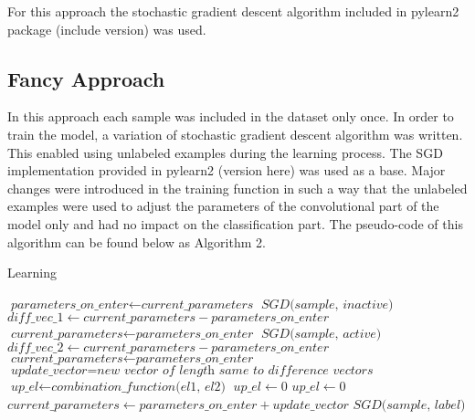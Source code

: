 \documentclass[a4paper,10pt]{report}
\begin{document}
      For this approach the stochastic gradient descent algorithm included in pylearn2 package (include version) was used.\\
	  
      \subsection{Fancy Approach}
      In this approach each sample was included in the dataset only once. In order to train the model, a variation of stochastic gradient descent algorithm was written. This enabled using unlabeled examples during the learning process. The SGD implementation provided in pylearn2 (version here) was used as a base. Major changes were introduced in the training function in such a way that the unlabeled examples were used to adjust the parameters of the convolutional part of the model only and had no impact on the classification part. The pseudo-code of this algorithm can be found below as Algorithm 2.\\
      
      \begin{algorithm}
      \caption{Learning}\label{euclid}
      \begin{algorithmic}[1]
	\State $\textit{parameters\_on\_enter} \gets \textit{current\_parameters}$
	\State
	\State $\textit{SGD(sample, inactive)}$
	\State $\textit{diff\_vec\_1} \gets \textit{current\_parameters} -\textit{parameters\_on\_enter}$
	\State $\textit{current\_parameters} \gets \textit{parameters\_on\_enter}$
	\State
	\State $\textit{SGD(sample, active)}$
	\State $\textit{diff\_vec\_2} \gets \textit{current\_parameters} - \textit{parameters\_on\_enter}$
	\State $\textit{current\_parameters} \gets \textit{parameters\_on\_enter}$
	\State
	\State $\textit{update\_vector} = \textit{new vector of length same to difference vectors}$
	    \State $\textit{up\_el} \gets \textit{combination\_function(el1, el2)}$
	  \Else
	    \State $\textit{up\_el} \gets 0$
	  \EndIf
	\EndFor
	\State
	    \State $\textit{up\_el} \gets 0$
	  \EndIf
	\EndFor
	\State
	\State $\textit{current\_parameters} \gets \textit{parameters\_on\_enter} + \textit{update\_vector}$
	\Else
	\State $\textit{SGD(sample, label)}$
      \EndIf
      \State
      \EndProcedure
      \end{algorithmic}
      \end{algorithm}
      
\end{document}
